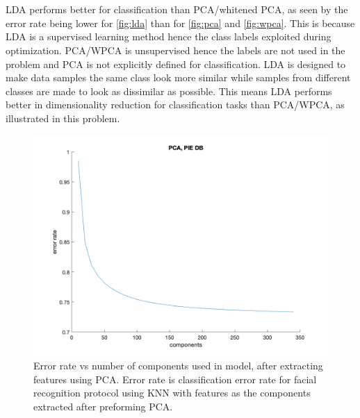 \documentclass[12pt,twoside]{article}
\begin{document}



\section{}
LDA performs better for classification than PCA/whitened PCA, as seen by the error rate being lower for \autoref{fig:lda} than for \autoref{fig:pca} and \autoref{fig:wpca}. This is because LDA is a supervised learning method hence the class labels exploited during optimization. PCA/WPCA is unsupervised hence the labels are not used in the problem and PCA is not explicitly defined for classification. LDA is designed to make data samples the same class look more similar while samples from different classes are made to look as dissimilar as possible. This means LDA performs better in dimensionality reduction for classification tasks than PCA/WPCA, as illustrated in this problem.

\begin{figure}[H]
    \centering
    \includegraphics[width = 0.8\hsize]{./figures/pca.png}
    \caption[...]{Error rate vs number of components used in model, after extracting features using PCA. Error rate is classification error rate for facial recognition protocol using KNN with features as the components extracted after preforming PCA.}
    \label{fig:pca}
\end{figure}
\end{document}
